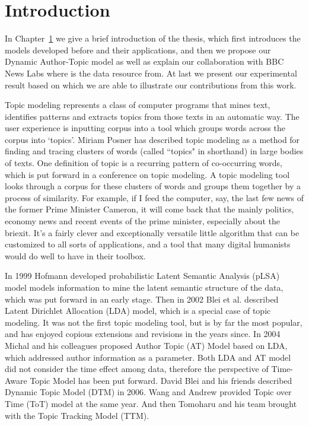 \chapter{Introduction}
\label{chapterlabel1}



In Chapter~\ref{chapterlabel1} we give a brief introduction of the thesis, which first introduces the models developed before and their applications, and then we propose our Dynamic Author-Topic model as well as explain our collaboration with BBC News Labs where is the data resource from. At last we present our experimental result based on which we are able to illustrate our contributions from this work. 

Topic modeling represents a class of computer programs that mines text, identifies patterns and extracts topics from those texts in an automatic way. The user experience is inputting corpus into a tool which groups words across the corpus into ‘topics’. Miriam Posner \cite{posner2012very} has described topic modeling as a method for finding and tracing clusters of words (called ``topics" in shorthand) in large bodies of texts. One definition of topic is a recurring pattern of co-occurring words, which is put forward in a conference on topic modeling. A topic modeling tool looks through a corpus for these clusters of words and groups them together by a process of similarity. For example, if I feed the computer, say, the last few news of the former Prime Minister Cameron, it will come back that the mainly politics, economy news and recent events  of the prime minister, especially about the briexit. It’s a fairly clever and exceptionally versatile little algorithm that can be customized to all sorts of applications, and a tool that many digital humanists would do well to have in their toolbox.

In 1999 Hofmann \cite{hofmann1999probabilistic} developed probabilistic Latent Semantic Analysis (pLSA) model models information to mine the latent semantic structure of the data, which was put forward in an early stage. Then in 2002 Blei et al. \cite{blei2003latent} described Latent Dirichlet Allocation (LDA) model, which is a special case of topic modeling. It was not the first topic modeling tool, but is by far the most popular, and has enjoyed copious extensions and revisions in the years since. In 2004 Michal and his colleagues proposed Author Topic (AT) Model \cite{rosen2004author} based on LDA, which addressed author information as a parameter. Both LDA and AT model did not consider the time effect among data, therefore the perspective of Time-Aware Topic Model has been put forward. David Blei \cite{blei2006dynamic} and his friends described Dynamic Topic Model (DTM) in 2006. Wang and Andrew \cite{wang2006topics} provided Topic over Time (ToT) model at the same year. And then Tomoharu \cite{iwata2009topic} and his team brought with the Topic Tracking Model (TTM).

